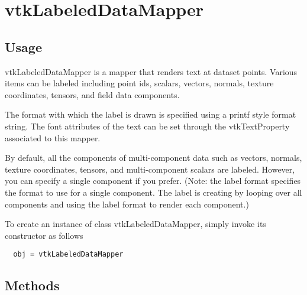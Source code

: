 \section{vtkLabeledDataMapper}

\subsection{Usage}

 vtkLabeledDataMapper is a mapper that renders text at dataset
 points. Various items can be labeled including point ids, scalars,
 vectors, normals, texture coordinates, tensors, and field data components.

 The format with which the label is drawn is specified using a
 printf style format string. The font attributes of the text can
 be set through the vtkTextProperty associated to this mapper. 

 By default, all the components of multi-component data such as
 vectors, normals, texture coordinates, tensors, and multi-component
 scalars are labeled. However, you can specify a single component if
 you prefer. (Note: the label format specifies the format to use for
 a single component. The label is creating by looping over all components
 and using the label format to render each component.)

To create an instance of class vtkLabeledDataMapper, simply
invoke its constructor as follows
\begin{verbatim}
  obj = vtkLabeledDataMapper
\end{verbatim}
\subsection{Methods}

